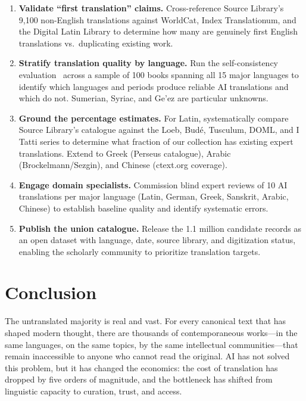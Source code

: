 \documentclass[10pt,twocolumn]{article}
\begin{document}
\begin{enumerate}
\item \textbf{Validate ``first translation'' claims.} Cross-reference Source Library's 9,100 non-English translations against WorldCat, Index Translationum, and the Digital Latin Library to determine how many are genuinely first English translations vs.\ duplicating existing work.
\item \textbf{Stratify translation quality by language.} Run the self-consistency evaluation~\cite{lomas2026ocr} across a sample of 100 books spanning all 15 major languages to identify which languages and periods produce reliable AI translations and which do not. Sumerian, Syriac, and Ge'ez are particular unknowns.
\item \textbf{Ground the percentage estimates.} For Latin, systematically compare Source Library's catalogue against the Loeb, Bud\'e, Tusculum, DOML, and I Tatti series to determine what fraction of our collection has existing expert translations. Extend to Greek (Perseus catalogue), Arabic (Brockelmann/Sezgin), and Chinese (ctext.org coverage).
\item \textbf{Engage domain specialists.} Commission blind expert reviews of 10 AI translations per major language (Latin, German, Greek, Sanskrit, Arabic, Chinese) to establish baseline quality and identify systematic errors.
\item \textbf{Publish the union catalogue.} Release the 1.1 million candidate records as an open dataset with language, date, source library, and digitization status, enabling the scholarly community to prioritize translation targets.
\end{enumerate}

\section{Conclusion}

The untranslated majority is real and vast. For every canonical text that has shaped modern thought, there are thousands of contemporaneous works---in the same languages, on the same topics, by the same intellectual communities---that remain inaccessible to anyone who cannot read the original. AI has not solved this problem, but it has changed the economics: the cost of translation has dropped by five orders of magnitude, and the bottleneck has shifted from linguistic capacity to curation, trust, and access.
\end{document}
